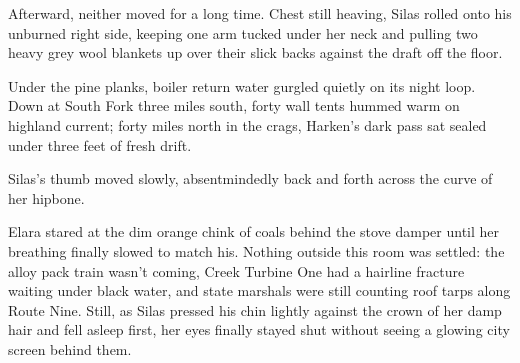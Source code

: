 Afterward, neither moved for a long time. Chest still heaving, Silas rolled onto his unburned right side, keeping one arm tucked under her neck and pulling two heavy grey wool blankets up over their slick backs against the draft off the floor.

Under the pine planks, boiler return water gurgled quietly on its night loop. Down at South Fork three miles south, forty wall tents hummed warm on highland current; forty miles north in the crags, Harken's dark pass sat sealed under three feet of fresh drift.

Silas's thumb moved slowly, absentmindedly back and forth across the curve of her hipbone.

Elara stared at the dim orange chink of coals behind the stove damper until her breathing finally slowed to match his. Nothing outside this room was settled: the alloy pack train wasn't coming, Creek Turbine One had a hairline fracture waiting under black water, and state marshals were still counting roof tarps along Route Nine. Still, as Silas pressed his chin lightly against the crown of her damp hair and fell asleep first, her eyes finally stayed shut without seeing a glowing city screen behind them.
